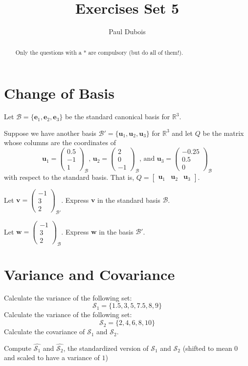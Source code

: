 \documentclass[]{article}
\title{Exercises Set 5}
\author{Paul Dubois}
\begin{document}
	
	\maketitle
	
	\begin{abstract}
		Only the questions with a * are compulsory (but do all of them!).
	\end{abstract}	
	
	\section{Change of Basis}

	Let $\mathcal{B} = \{ \mathbf{e}_1, \mathbf{e}_2, \mathbf{e}_3 \}$ be the standard canonical basis for $\mathbb{R}^3$.

	Suppose we have another basis $\mathcal{B}' = \{ \mathbf{u}_1, \mathbf{u}_2, \mathbf{u}_3 \}$ for $\mathbb{R}^3$ and let $Q$ be the matrix whose columns are the coordinates of 
	$$
	\mathbf{u}_1 = \begin{pmatrix} 0.5 \\ -1 \\ 1 \end{pmatrix}_{\mathcal{B}}
	\textit{, }
	\mathbf{u}_2 = \begin{pmatrix} 2 \\ 0 \\ -1 \end{pmatrix}_{\mathcal{B}}
	\text{, and }
	\mathbf{u}_3 = \begin{pmatrix} -0.25 \\ 0.5 \\ 0 \end{pmatrix}_{\mathcal{B}}
	$$
	with respect to the standard basis.
	That is, $
	Q = \begin{bmatrix}
		\mathbf{u}_1 & \mathbf{u}_2 & \mathbf{u}_3
	\end{bmatrix}
	$.
	
	Let $\mathbf{v} = \begin{pmatrix} -1 \\ 3 \\ 2 \end{pmatrix}_{\mathcal{B}'}$.
	Express $\mathbf{v}$ in the standard basis $\mathcal{B}$.
	
	Let $\mathbf{w} = \begin{pmatrix} -1 \\ 3 \\ 2 \end{pmatrix}_{\mathcal{B}}$.
	Express $\mathbf{w}$ in the basis $\mathcal{B}'$.
	
	\section{Variance and Covariance}
	Calculate the variance of the following set:
	$$
	\mathcal{S}_1 = \{ 1.5, 3, 5, 7.5, 8, 9 \}
	$$
	Calculate the variance of the following set:
	$$
	\mathcal{S}_2 = \{ 2, 4, 6, 8, 10 \}
	$$
	Calculate the covariance of $\mathcal{S}_1$ and $\mathcal{S}_2$.
	
	Compute $\hat{\mathcal{S}_1}$ and $\hat{\mathcal{S}_2}$, the standardized version of $\mathcal{S}_1$ and $\mathcal{S}_2$ (shifted to mean $0$ and scaled to have a variance of $1$)
\end{document}
